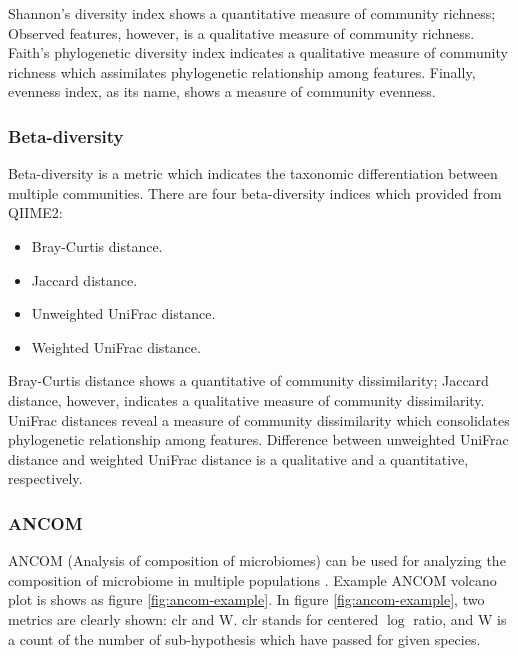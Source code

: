 \documentclass[a4paper]{article}
\begin{document}
                Shannon's diversity index shows a quantitative measure of community richness; Observed features, however, is a qualitative measure of community richness. Faith's phylogenetic diversity index indicates a qualitative measure of community richness which assimilates phylogenetic relationship among features. Finally, evenness index, as its name, shows a measure of community evenness.

            \subsubsection{Beta-diversity}
                Beta-diversity is a metric which indicates the taxonomic differentiation between multiple communities. There are four beta-diversity indices which provided from QIIME2:
                \begin{itemize}
                    \item Bray-Curtis distance.
                    \item Jaccard distance.
                    \item Unweighted UniFrac distance.
                    \item Weighted UniFrac distance.
                \end{itemize}

                Bray-Curtis distance shows a quantitative of community dissimilarity; Jaccard distance, however, indicates a qualitative measure of community dissimilarity. UniFrac distances reveal a measure of community dissimilarity which consolidates phylogenetic relationship among features. Difference between unweighted UniFrac distance and weighted UniFrac distance is a qualitative and a quantitative, respectively.

            \subsubsection{ANCOM}
                ANCOM (Analysis of composition of microbiomes) can be used for analyzing the composition of microbiome in multiple populations \cite{ANCOM1}. Example ANCOM volcano plot is shows as figure \ref{fig:ancom-example}. In figure \ref{fig:ancom-example}, two metrics are clearly shown: clr and W. clr stands for centered $\log$ ratio, and W is a count of the number of sub-hypothesis which have passed for given species.
\end{document}
